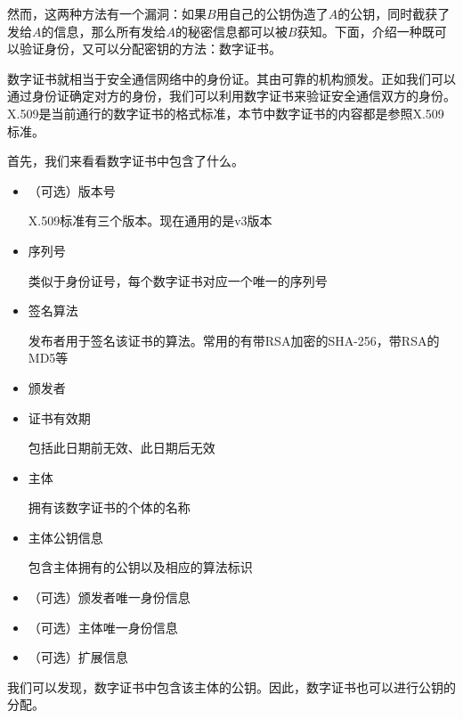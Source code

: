 然而，这两种方法有一个漏洞：如果$B$用自己的公钥伪造了$A$的公钥，同时截获了发给$A$的信息，那么所有发给$A$的秘密信息都可以被$B$获知。下面，介绍一种既可以验证身份，又可以分配密钥的方法：数字证书。\par
数字证书就相当于安全通信网络中的身份证。其由可靠的机构颁发。正如我们可以通过身份证确定对方的身份，我们可以利用数字证书来验证安全通信双方的身份。X.509是当前通行的数字证书的格式标准，本节中数字证书的内容都是参照X.509标准。\par
首先，我们来看看数字证书中包含了什么。
\begin{itemize}
	\item （可选）版本号\par
	X.509标准有三个版本。现在通用的是v3版本
	\item 序列号\par
	类似于身份证号，每个数字证书对应一个唯一的序列号
	\item 签名算法\par
	发布者用于签名该证书的算法。常用的有带RSA加密的SHA-256，带RSA的MD5等
	\item 颁发者
	\item 证书有效期\par
	包括此日期前无效、此日期后无效
	\item 主体\par
	拥有该数字证书的个体的名称
	\item 主体公钥信息\par
	包含主体拥有的公钥以及相应的算法标识
	\item （可选）颁发者唯一身份信息
	\item （可选）主体唯一身份信息
	\item （可选）扩展信息
\end{itemize}

我们可以发现，数字证书中包含该主体的公钥。因此，数字证书也可以进行公钥的分配。
